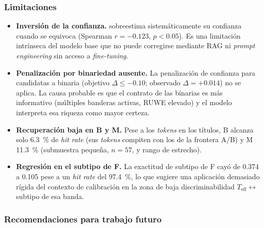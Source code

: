 \subsubsection{Limitaciones}
\label{sec:concl-limitaciones}

\begin{itemize}
  \item \textbf{Inversión de la confianza.} \AstroSage{} sobreestima
  sistemáticamente su confianza cuando se equivoca (Spearman $r=-0.123$,
  $p<0.05$). Es una limitación intrínseca del modelo base que no puede corregirse
  mediante RAG ni \emph{prompt engineering} sin acceso a \emph{fine-tuning}.
  \item \textbf{Penalización por binariedad ausente.} La penalización de confianza
  para candidatas a binaria (objetivo $\Delta\le-0.10$; observado $\Delta=+0.014$)
  no se aplica. La causa probable es que el contrato de las binarias es más
  informativo (múltiples banderas activas, RUWE elevado) y el modelo interpreta esa
  riqueza como mayor certeza.
  \item \textbf{Recuperación baja en B y M.} Pese a los \emph{tokens} en los
  títulos, B alcanza solo \SI{6.3}{\percent} de \emph{hit rate} (sus \emph{tokens}
  compiten con los de la frontera A/B) y M \SI{11.3}{\percent} (submuestra pequeña,
  $n=57$, y rango de \teff{} estrecho).
  \item \textbf{Regresión en el subtipo de F.} La exactitud de subtipo de F cayó de
  \num{0.374} a \num{0.105} pese a un \emph{hit rate} del \SI{97.4}{\percent}, lo
  que sugiere una aplicación demasiado rígida del contexto de calibración en la
  zona de baja discriminabilidad $T_\mathrm{eff}\leftrightarrow$subtipo de esa
  banda.
\end{itemize}

\subsubsection{Recomendaciones para trabajo futuro}
\label{sec:concl-recom}

